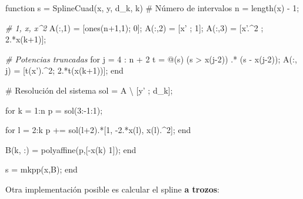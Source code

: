 \documentclass[11pt,spanish,]{article}
\newenvironment{Shaded}{}{}
\newcommand{\BaseNTok}[1]{\textcolor[rgb]{0.25,0.63,0.44}{{#1}}}
\newcommand{\FloatTok}[1]{\textcolor[rgb]{0.25,0.63,0.44}{{#1}}}
\newcommand{\CommentTok}[1]{\textcolor[rgb]{0.38,0.63,0.69}{\textit{{#1}}}}
\newcommand{\FunctionTok}[1]{\textcolor[rgb]{0.02,0.16,0.49}{{#1}}}
\newcommand{\NormalTok}[1]{{#1}}
\theoremstyle{definition} \newtheorem*{definicion}{Definición}
\begin{document}
\begin{Shaded}
\begin{Highlighting}[]
\NormalTok{function s = SplineCuad(x, y, d_k, k)}
  \NormalTok{# Número de intervalos}
  \NormalTok{n = }\FunctionTok{length}\NormalTok{(x) - }\FloatTok{1}\NormalTok{;}

  \CommentTok{# 1, x, x^2}
  \NormalTok{A(:,}\FloatTok{1}\NormalTok{) = [}\FunctionTok{ones}\NormalTok{(n+}\FloatTok{1}\NormalTok{,}\FloatTok{1}\NormalTok{); }\FloatTok{0}\NormalTok{];}
  \NormalTok{A(:,}\FloatTok{2}\NormalTok{) = [x'         ; }\FloatTok{1}\NormalTok{];}
  \NormalTok{A(:,}\FloatTok{3}\NormalTok{) = [x'.^}\FloatTok{2}      \NormalTok{; }\FloatTok{2}\NormalTok{.*x(k+}\FloatTok{1}\NormalTok{)];}

  \CommentTok{# Potencias truncadas}
  \NormalTok{for }\BaseNTok{j} \NormalTok{= }\FloatTok{4} \NormalTok{: n + }\FloatTok{2}
    \NormalTok{t       =  @(s) (s > x(}\BaseNTok{j}\NormalTok{-}\FloatTok{2}\NormalTok{)) .* (s - x(}\BaseNTok{j}\NormalTok{-}\FloatTok{2}\NormalTok{));}
    \NormalTok{A(:, }\BaseNTok{j}\NormalTok{) = [t(x').^}\FloatTok{2}\NormalTok{; }\FloatTok{2}\NormalTok{.*t(x(k+}\FloatTok{1}\NormalTok{))];}
  \NormalTok{end}

  \NormalTok{# Resolución del sistema}
  \NormalTok{sol = A \textbackslash{} [y' ; d_k];}

  \NormalTok{for k = }\FloatTok{1}\NormalTok{:n}
    \NormalTok{p = sol(}\FloatTok{3}\NormalTok{:-}\FloatTok{1}\NormalTok{:}\FloatTok{1}\NormalTok{);}

    \NormalTok{for l = }\FloatTok{2}\NormalTok{:k}
      \NormalTok{p += sol(l+}\FloatTok{2}\NormalTok{).*[}\FloatTok{1}\NormalTok{, -}\FloatTok{2}\NormalTok{.*x(l), x(l).^}\FloatTok{2}\NormalTok{];}
    \NormalTok{end}

    \NormalTok{B(k, :) = polyaffine(p,[-x(k) }\FloatTok{1}\NormalTok{]);}
  \NormalTok{end}

  \NormalTok{s = }\FunctionTok{mkpp}\NormalTok{(x,B);}
\NormalTok{end}
\end{Highlighting}
\end{Shaded}

Otra implementación posible es calcular el spline \textbf{a trozos}:
\end{document}
